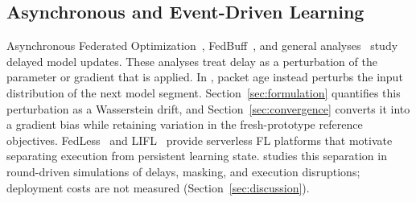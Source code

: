 \subsection{Asynchronous and Event-Driven Learning}
Asynchronous Federated Optimization~\cite{xie2019asynchronous}, FedBuff~\cite{nguyen2022federated}, and general analyses~\cite{fraboni2023general} study delayed model updates. These analyses treat delay as a perturbation of the parameter or gradient that is applied. In \ehsfp{}, packet age instead perturbs the input distribution of the next model segment. Section~\ref{sec:formulation} quantifies this perturbation as a Wasserstein drift, and Section~\ref{sec:convergence} converts it into a gradient bias while retaining variation in the fresh-prototype reference objectives.
FedLess~\cite{grafberger2021fedless} and LIFL~\cite{qi2024lifl} provide serverless FL platforms that motivate separating execution from persistent learning state. \ehsfp{} studies this separation in round-driven simulations of delays, masking, and execution disruptions; deployment costs are not measured (Section~\ref{sec:discussion}).
